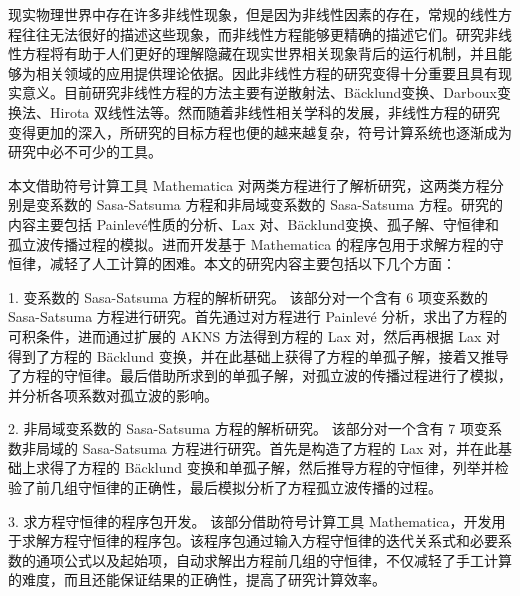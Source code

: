 


\begin{cabstract}
现实物理世界中存在许多非线性现象，但是因为非线性因素的存在，常规的线性方程往往无法很好的描述这些现象，而非线性方程能够更精确的描述它们。研究非线性方程将有助于人们更好的理解隐藏在现实世界相关现象背后的运行机制，并且能够为相关领域的应用提供理论依据。因此非线性方程的研究变得十分重要且具有现实意义。目前研究非线性方程的方法主要有逆散射法、B\"{a}cklund变换、Darboux变换法、Hirota 双线性法等。然而随着非线性相关学科的发展，非线性方程的研究变得更加的深入，所研究的目标方程也便的越来越复杂，符号计算系统也逐渐成为研究中必不可少的工具。

本文借助符号计算工具 Mathematica 对两类方程进行了解析研究，这两类方程分别是变系数的 Sasa-Satsuma 方程和非局域变系数的 Sasa-Satsuma 方程。研究的内容主要包括 Painlev\'{e}性质的分析、Lax 对、B\"{a}cklund变换、孤子解、守恒律和孤立波传播过程的模拟。进而开发基于 Mathematica 的程序包用于求解方程的守恒律，减轻了人工计算的困难。本文的研究内容主要包括以下几个方面：

1. 变系数的 Sasa-Satsuma 方程的解析研究。
该部分对一个含有 6 项变系数的 Sasa-Satsuma 方程进行研究。首先通过对方程进行 Painlev\'{e} 分析，求出了方程的可积条件，进而通过扩展的 AKNS 方法得到方程的 Lax 对，然后再根据 Lax 对得到了方程的 B\"{a}cklund 变换，并在此基础上获得了方程的单孤子解，接着又推导了方程的守恒律。最后借助所求到的单孤子解，对孤立波的传播过程进行了模拟，并分析各项系数对孤立波的影响。

2. 非局域变系数的 Sasa-Satsuma 方程的解析研究。
该部分对一个含有 7 项变系数非局域的 Sasa-Satsuma 方程进行研究。首先是构造了方程的 Lax 对，并在此基础上求得了方程的 B\"{a}cklund 变换和单孤子解，然后推导方程的守恒律，列举并检验了前几组守恒律的正确性，最后模拟分析了方程孤立波传播的过程。

3. 求方程守恒律的程序包开发。
该部分借助符号计算工具 Mathematica，开发用于求解方程守恒律的程序包。该程序包通过输入方程守恒律的迭代关系式和必要系数的通项公式以及起始项，自动求解出方程前几组的守恒律，不仅减轻了手工计算的难度，而且还能保证结果的正确性，提高了研究计算效率。

\end{cabstract}


